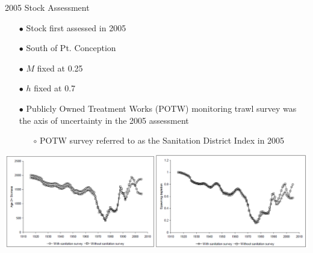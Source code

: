 \documentclass[ignorenonframetext,]{beamer}
\begin{document}
\begin{frame}{2005 Stock Assessment}

\begin{itemize}
\item[$\bullet$] Stock first assessed in 2005
\item[$\bullet$] South of Pt. Conception
\item[$\bullet$] $M$ fixed at 0.25
\item[$\bullet$] $h$ fixed at 0.7
\item[$\bullet$] Publicly Owned Treatment Works (POTW) monitoring trawl survey was the axis of uncertainty in the 2005 assessment
\begin{itemize}
\item[$\circ$] POTW survey referred to as the Sanitation District Index in 2005
\end{itemize}
\end{itemize}

\includegraphics{Figures/2005_bio_depl.png}

\end{frame}
\end{document}
